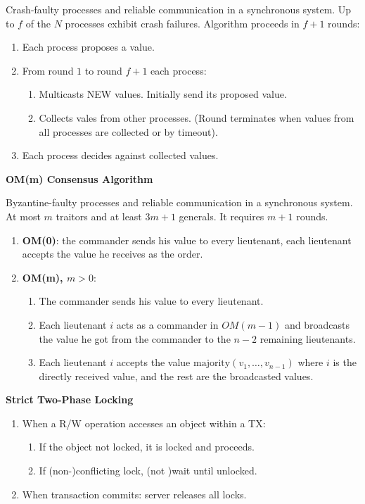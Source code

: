 \documentclass[a4paper, 10pt, twocolumn]{article}
\begin{document}
    Crash-faulty processes and reliable communication in a synchronous system.
    Up to $f$ of the $N$ processes exhibit crash failures.
    Algorithm proceeds in $f+1$ rounds:
    \begin{enumerate}
        \item Each process proposes a value.
        \item From round $1$ to round $f+1$ each process:
        \begin{enumerate}
            \item Multicasts NEW values. Initially send its proposed value.
            \item Collects vales from other processes. (Round terminates when values from all processes are collected or by timeout).
        \end{enumerate}
        \item Each process decides against collected values.
    \end{enumerate}

    \textbf{OM(m) Consensus Algorithm}

    Byzantine-faulty processes and reliable communication in a synchronous system.
    At most $m$ traitors and at least $3m + 1$ generals.
    It requires $m+1$ rounds.
    \begin{enumerate}
        \item \textbf{OM(0)}: the commander sends his value to every lieutenant, each lieutenant accepts the value he receives as the order.
        \item \textbf{OM(m), $m > 0$}:
        \begin{enumerate}
            \item The commander sends his value to every lieutenant.
            \item Each lieutenant $i$ acts as a commander in $OM(m-1)$ and broadcasts the value he got from the commander to the $n-2$ remaining lieutenants.
            \item Each lieutenant $i$ accepts the value $\text{majority}(v_1, \dots, v_{n-1})$ where $i$ is the directly received value, and the rest are the broadcasted values.
        \end{enumerate}
    \end{enumerate}

    \textbf{Strict Two-Phase Locking}
    \begin{enumerate}
        \item When a R/W operation accesses an object within a TX:
        \begin{enumerate}
            \item If the object not locked, it is locked and proceeds.
            \item If (non-)conflicting lock, (not )wait until unlocked.
        \end{enumerate}
        \item When transaction commits: server releases all locks.
    \end{enumerate}
\end{document}
